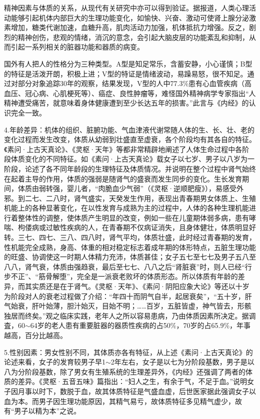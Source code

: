 \documentclass[draft,12pt]{ctexbook}
\begin{document}
精神因素与体质的关系，从现代有关研究中亦可以得到验证。据报道，人类心理活动能够引起机体内部巨大的生理功能变化，如愉快、兴奋、激动可使肾上腺分泌激素增加，糖类代谢加速，血糖升高，肌肉活动力加强，机体抵抗力增强。反之，剧烈的精神创伤，悲观的情绪，消沉的意念，会引起大脑皮层的功能紊乱和抑制，从而引起一系列相关的脏器功能和器质的病变。

国外有人把人的性格分为三种类型。A型是知足常乐，含蓄安静，小心谨慎；B型的特征是活泼开朗，积极上进；V型的特证是情绪波动，易躁易怒，很不知足。通过对部分对象追踪30年的观察，结果发现，V型的人中77.3\%患有心血管疾病（高血压、冠心病、心肌梗死等）、癌症、良性肿瘤等，难怪国外精神病学专家指出“人精神遭受痛苦，就意味着身体健康遭到至少长达五年的损害。”此言与《内经》的认识完全一致。

4.年龄差异：机体的组织、脏腑功能、气血津液代谢常随人体的生、长、壮、老的变化过程而发生改变，体质从幼弱到壮盛直至虚衰，各个阶段均有其各自的特征。《素问·上古天真论》、《灵枢·天年》等都非常精辟地阐述了人体生命过程中各阶段体质变化的不同特征。如《素问·上古天真论》载女子以七岁、男子以八岁为一阶段，论述了各不同年龄段的生理特征及体质情况。并说明在整个过程中肾气始终在起着主导的作用，体质的强弱是随肾气的盛衰而发生同步的变化。生长发育期间，体质由弱转强，婴儿者，“肉脆血少气弱”（《灵枢·逆顺肥瘦》），易感受外邪。到二七、二八时，肾气盛实，天癸发生作用，表现出青春期男女体质上、生殖机能上的各种显著变化，在以性发育与成熟为主的过程中，人体的各种生理机能进行着整体性的调整，使体质产生明显的改变，例如一些在儿童期体弱多病，患有哮喘、枸偻病或过敏性疾病的人，在青春期不仅病证消失，且身体健壮，体质明显好转。三七、四七、三八、四八时，肾气平均，体质壮盛，此时经过青春期的发育，性机能完全成熟，身高、体重的相对稳定标志着成年期的体形特点，五脏生理功能的旺盛、协调使这一时期人体精力充沛，体质甚佳；女子五七至七七及男子五八至八八，肾气衰，体质由强趋衰，最后至七七、八八之后“肾脏衰”时，则人已经“行步不正”、“筋骨解堕”，完全是一派衰老败坏的体质形态。所以体质有年龄的差异，而其实质还是在于肾气。《灵枢·天年》、《素问·阴阳应象大论》等还以十岁为阶段对人的衰老过程做了介绍：“年四十而阴气自半，起居衰矣”，“五十岁，肝气始衰，肝叶始薄，胆汁始灭，目始不明；……百岁，五脏皆虚，神气皆去，形骸独居而终矣。”观之临床实践，老年人之所以容易患病，乃由体质因素所决定。据调査，60$\sim$64岁的老人患有重要脏器的器质性疾病的占50\%，70岁的占65.9\%，年事越高，百分比越高。

5.性别因素：男女性别不同，其体质亦各有特征，从上述《素问·上古天真论》的论述来看，女子的发育较男子早1$\sim$2年左右，女子是以七为分阶段基数，男子是以八为分阶段基数，除了男女有生殖系统的生理差异外，《内经》还强调了两者的体质的差异。《灵枢·五音五味》篇指出：“妇人之生，有余于气，不足于血。”说明女子因月事以时下，数脱于血，故其体质特征是气盛血虚，后世医家据此强调女子以血为本。而男子因生理功能原因，其精气易亏，故体质特征多见精气虚少，故有“男子以精为本”之说。
\end{document}
